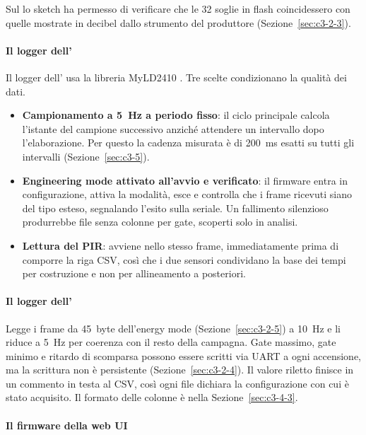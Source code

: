 Sul \ldc{} lo sketch ha permesso di verificare che le 32 soglie in flash coincidessero con quelle mostrate in decibel dallo strumento del produttore (Sezione~\ref{sec:c3-2-3}).

\paragraph{Il logger dell'\ldb{}}

Il logger dell'\ldb{} usa la libreria MyLD2410 \cite{myld2410}. Tre scelte condizionano la qualità dei dati.

\begin{itemize}
  \item \textbf{Campionamento a 5~Hz a periodo fisso}: il ciclo principale calcola l'istante del campione successivo anziché attendere un intervallo dopo l'elaborazione. Per questo la cadenza misurata è di 200~ms esatti su tutti gli intervalli (Sezione~\ref{sec:c3-5}).
  \item \textbf{Engineering mode attivato all'avvio e verificato}: il firmware entra in configurazione, attiva la modalità, esce e controlla che i frame ricevuti siano del tipo esteso, segnalando l'esito sulla seriale. Un fallimento silenzioso produrrebbe file senza colonne per gate, scoperti solo in analisi.
  \item \textbf{Lettura del PIR}: avviene nello stesso frame, immediatamente prima di comporre la riga CSV, così che i due sensori condividano la base dei tempi per costruzione e non per allineamento a posteriori.
\end{itemize}

\paragraph{Il logger dell'\ldc{}}

Legge i frame da 45~byte dell'energy mode (Sezione~\ref{sec:c3-2-5}) a 10~Hz e li riduce a 5~Hz per coerenza con il resto della campagna. Gate massimo, gate minimo e ritardo di scomparsa possono essere scritti via UART a ogni accensione, ma la scrittura non è persistente (Sezione~\ref{sec:c3-2-4}). Il valore riletto finisce in un commento in testa al CSV, così ogni file dichiara la configurazione con cui è stato acquisito. Il formato delle colonne è nella Sezione~\ref{sec:c3-4-3}.

\paragraph{Il firmware della web UI}

